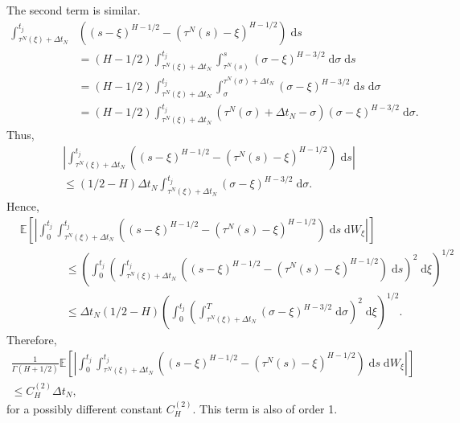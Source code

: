 \documentclass[reqno,12pt]{amsart}
\theoremstyle{plain}%
\theoremstyle{definition}
\begin{document}
The second term is similar.
\begin{align*}
    \int_{\tau^N(\xi)+\Delta t_N}^{t_j} & \left( (s-\xi)^{H-1/2} - (\tau^N(s)-\xi)^{H-1/2}\right) \;\mathrm{d}s \\ 
    & = (H-1/2)\int_{\tau^N(\xi)+\Delta t_N}^{t_j} \int_{\tau^N(s)}^s (\sigma - \xi)^{H - 3/2} \;\mathrm{d}\sigma \;\mathrm{d}s \\
    & = (H-1/2)\int_{\tau^N(\xi)+\Delta t_N}^{t_j} \int_\sigma^{\tau^N(\sigma) + \Delta t_N} (\sigma - \xi)^{H - 3/2} \;\mathrm{d}s \;\mathrm{d}\sigma \\
    & = (H-1/2)\int_{\tau^N(\xi)+\Delta t_N}^{t_j} \left(\tau^N(\sigma) + \Delta t_N - \sigma\right) (\sigma - \xi)^{H - 3/2} \;\mathrm{d}\sigma.
\end{align*}
Thus,
\begin{multline*}
    \left| \int_{\tau^N(\xi)+\Delta t_N}^{t_j} \left( (s-\xi)^{H-1/2} - (\tau^N(s)-\xi)^{H-1/2}\right) \;\mathrm{d}s \right| \\
    \leq (1/2 - H)\Delta t_N \int_{\tau^N(\xi)+\Delta t_N}^{t_j} (\sigma - \xi)^{H - 3/2} \;\mathrm{d}\sigma.
\end{multline*}
Hence,
\begin{align*}
    & \mathbb{E}\left[\left|\int_{0}^{t_j} \int_{\tau^N(\xi)+\Delta t_N}^{t_j} \left( (s-\xi)^{H-1/2} - (\tau^N(s)-\xi)^{H-1/2}\right) \;\mathrm{d}s \;\mathrm{d}W_\xi\right|\right] \\
    & \qquad\qquad \leq \left(\int_{0}^{t_j} \left(\int_{\tau^N(\xi)+\Delta t_N}^{t_j} \left( (s-\xi)^{H-1/2} - (\tau^N(s)-\xi)^{H-1/2}\right) \;\mathrm{d}s \right)^2 \;\mathrm{d}\xi \right)^{1/2} \\
    & \qquad\qquad \leq \Delta t_N (1/2 - H)\left(\int_{0}^{t_j} \left( \int_{\tau^N(\xi)+\Delta t_N}^{T} (\sigma - \xi)^{H-3/2} \;\mathrm{d}\sigma \right)^2 \;\mathrm{d}\xi \right)^{1/2}.
\end{align*}
Therefore,
\begin{multline}
    \label{secondtermfBm}
    \frac{1}{\Gamma(H + 1/2)}\mathbb{E}\left[\left|\int_{0}^{t_j} \int_{\tau^N(\xi)+\Delta t_N}^{t_j} \left( (s-\xi)^{H-1/2} - (\tau^N(s)-\xi)^{H-1/2}\right)  \;\mathrm{d}s \;\mathrm{d}W_\xi\right|\right] \\
    \leq C_H^{(2)}\Delta t_N,
\end{multline}
for a possibly different constant $C_H^{(2)}$. This term is also of order 1.
\end{document}
